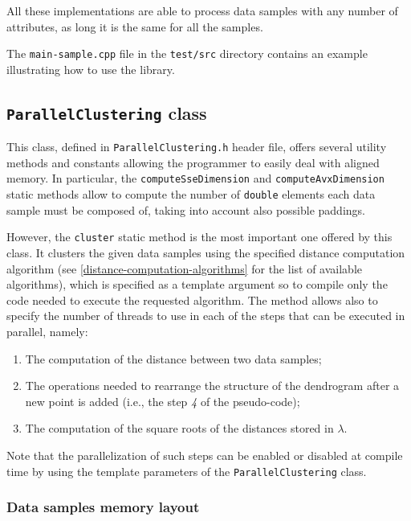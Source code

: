 \documentclass{article}
\begin{document}
All these implementations are able to process data samples with any number of attributes,
as long it is the same for all the samples.

The \texttt{main-sample.cpp} file in the \texttt{test/src} directory contains an example
illustrating how to use the library.

\hypertarget{parallel-clustering}{%
\subsection{\texttt{ParallelClustering} class}
\label{parallel-clustering}}
This class, defined in \texttt{ParallelClustering.h} header file, offers several utility methods and
constants allowing the programmer to easily deal with aligned memory. In particular, the
\texttt{computeSseDimension} and \texttt{computeAvxDimension} static methods allow to compute the
number of \texttt{double} elements each data sample must be composed of, taking into account also
possible paddings.

However, the \texttt{cluster} static method is the most important one offered by this class. It
clusters
the given data samples using the specified distance computation algorithm (see
\ref{distance-computation-algorithms} for the list of available algorithms), which
is specified as a template argument so to compile only the code needed to execute the requested
algorithm.
The method allows also to specify the number of threads to use in each of the steps that can be
executed in parallel, namely:
\begin{enumerate}
\item The computation of the distance between two data samples;

\item The operations needed to rearrange the structure of the dendrogram after a new point is
added (i.e., the step \textit{4} of the pseudo-code);

\item The computation of the square roots of the distances stored in $\lambda$.
\end{enumerate}
Note that the parallelization of such steps can be enabled or disabled at compile time by using the
template parameters of the \texttt{ParallelClustering} class.

\hypertarget{par-data-samples-layout}{
\subsubsection{Data samples memory layout}
\label{par-data-samples-layout}}
\end{document}

